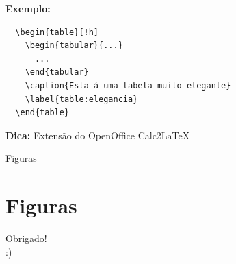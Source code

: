 \documentclass[12pt]{beamer}
\begin{document}
\begin{frame}[fragile]
  \textbf{Exemplo:}
  \begin{verbatim}
  \begin{table}[!h]
    \begin{tabular}{...}
      ...
    \end{tabular}
    \caption{Esta á uma tabela muito elegante}
    \label{table:elegancia}
  \end{table}
  \end{verbatim}

  \textbf{Dica:} Extensão do OpenOffice Calc2LaTeX
\end{frame}

\begin{frame}{Figuras}
  \section{Figuras}
\end{frame}

\begin{frame}
  \begin{center}
    \large Obrigado!\\
    :)
  \end{center}
\end{frame}
\end{document}
